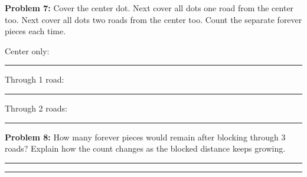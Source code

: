 \documentclass[12pt,letterpaper]{article}
\newcommand{\problem}[2]{\par\textbf{Problem #1:} #2\par}
\begin{document}
\problem{7}{Cover the center dot. Next cover all dots one road from the center too. Next cover all dots two roads from the center too. Count the separate forever pieces each time.}
\begin{center}
\end{center}
Center only: \rule{.6in}{.4pt}\hfill Through 1 road: \rule{.6in}{.4pt}\hfill Through 2 roads: \rule{.6in}{.4pt}
\problem{8}{How many forever pieces would remain after blocking through 3 roads? Explain how the count changes as the blocked distance keeps growing.}
\vspace{.25in}\rule{\linewidth}{.4pt}\par\vspace{.3in}\rule{\linewidth}{.4pt}
\end{document}
